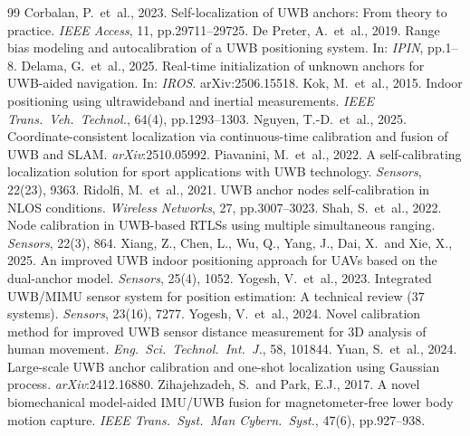 \documentclass[10pt,a4paper]{article}
\begin{document}
\begin{thebibliography}{99}
\small
{} Corbalan, P.\ et~al., 2023. Self-localization of UWB anchors:
From theory to practice. \emph{IEEE Access}, 11, pp.29711--29725.
 De Preter, A.\ et~al., 2019. Range bias modeling and
autocalibration of a UWB positioning system. In: \emph{IPIN}, pp.1--8.
 Delama, G.\ et~al., 2025. Real-time initialization of unknown
anchors for UWB-aided navigation. In: \emph{IROS}. arXiv:2506.15518.
 Kok, M.\ et~al., 2015. Indoor positioning using ultrawideband and
inertial measurements. \emph{IEEE Trans.\ Veh.\ Technol.}, 64(4), pp.1293--1303.
 Nguyen, T.-D.\ et~al., 2025. Coordinate-consistent localization
via continuous-time calibration and fusion of UWB and SLAM. \emph{arXiv}:2510.05992.
 Piavanini, M.\ et~al., 2022. A self-calibrating
localization solution for sport applications with UWB technology. \emph{Sensors}, 22(23), 9363.
 Ridolfi, M.\ et~al., 2021. UWB anchor nodes self-calibration in
NLOS conditions. \emph{Wireless Networks}, 27, pp.3007--3023.
 Shah, S.\ et~al., 2022. Node calibration in UWB-based RTLSs using
multiple simultaneous ranging. \emph{Sensors}, 22(3), 864.
 Xiang, Z., Chen, L., Wu, Q., Yang, J., Dai, X.\ and Xie, X.,
2025. An improved UWB indoor positioning approach for UAVs based on the dual-anchor model.
\emph{Sensors}, 25(4), 1052.
 Yogesh, V.\ et~al., 2023. Integrated UWB/MIMU sensor system for
position estimation: A technical review (37 systems). \emph{Sensors}, 23(16), 7277.
 Yogesh, V.\ et~al., 2024. Novel calibration method for improved
UWB sensor distance measurement for 3D analysis of human movement. \emph{Eng.\ Sci.\ Technol.\ Int.\
J.}, 58, 101844.
 Yuan, S.\ et~al., 2024. Large-scale UWB anchor calibration and
one-shot localization using Gaussian process. \emph{arXiv}:2412.16880.
\bibitem[Zihajehzadeh(2017)]{zihajehzadeh_2017} Zihajehzadeh, S.\ and Park, E.J., 2017. A novel
biomechanical model-aided IMU/UWB fusion for magnetometer-free lower body motion capture. \emph{IEEE
Trans.\ Syst.\ Man Cybern.\ Syst.}, 47(6), pp.927--938.
\end{thebibliography}
\end{document}
